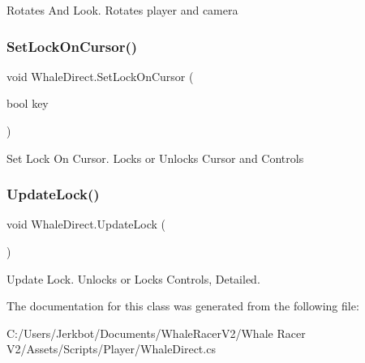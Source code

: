 Rotates And Look. Rotates player and camera 

\mbox{\label{class_whale_direct_a1c761dcd8ea22f316ade723a2fc0e09a}} 
\subsubsection{\texorpdfstring{Set\+Lock\+On\+Cursor()}{SetLockOnCursor()}}
{\footnotesize\ttfamily void Whale\+Direct.\+Set\+Lock\+On\+Cursor (\begin{DoxyParamCaption}\item[{bool}]{key }\end{DoxyParamCaption})}



Set Lock On Cursor. Locks or Unlocks Cursor and Controls 

\mbox{\label{class_whale_direct_a1eca2c459f459cd5b4bc6963c15aa5fb}} 
\subsubsection{\texorpdfstring{Update\+Lock()}{UpdateLock()}}
{\footnotesize\ttfamily void Whale\+Direct.\+Update\+Lock (\begin{DoxyParamCaption}{ }\end{DoxyParamCaption})}



Update Lock. Unlocks or Locks Controls, Detailed. 



The documentation for this class was generated from the following file\+:\begin{DoxyCompactItemize}
\item 
C\+:/\+Users/\+Jerkbot/\+Documents/\+Whale\+Racer\+V2/\+Whale Racer V2/\+Assets/\+Scripts/\+Player/Whale\+Direct.\+cs\end{DoxyCompactItemize}
